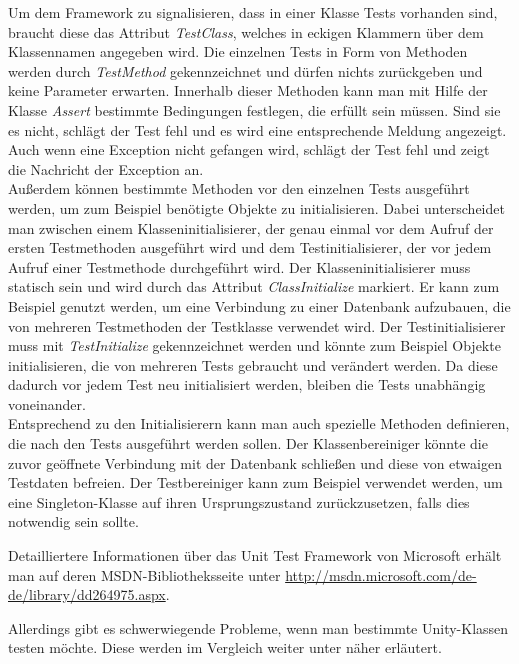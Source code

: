 Um dem Framework zu signalisieren, dass in einer Klasse Tests vorhanden sind, braucht diese das Attribut \textit{TestClass}, welches in eckigen Klammern über dem Klassennamen angegeben wird. Die einzelnen Tests in Form von Methoden werden durch \textit{TestMethod} gekennzeichnet und dürfen nichts zurückgeben und keine Parameter erwarten. Innerhalb dieser Methoden kann man mit Hilfe der Klasse \textit{Assert} bestimmte Bedingungen festlegen, die erfüllt sein müssen. Sind sie es nicht, schlägt der Test fehl und es wird eine entsprechende Meldung angezeigt. Auch wenn eine Exception nicht gefangen wird, schlägt der Test fehl und zeigt die Nachricht der Exception an.\\
Außerdem können bestimmte Methoden vor den einzelnen Tests ausgeführt werden, um zum Beispiel benötigte Objekte zu initialisieren. Dabei unterscheidet man zwischen einem Klasseninitialisierer, der genau einmal vor dem Aufruf der ersten Testmethoden ausgeführt wird und dem Testinitialisierer, der vor jedem Aufruf einer Testmethode durchgeführt wird. Der Klasseninitialisierer muss statisch sein und wird durch das Attribut \textit{ClassInitialize} markiert. Er kann zum Beispiel genutzt werden, um eine Verbindung zu einer Datenbank aufzubauen, die von mehreren Testmethoden der Testklasse verwendet wird. Der Testinitialisierer muss mit \textit{TestInitialize} gekennzeichnet werden und könnte zum Beispiel Objekte initialisieren, die von mehreren Tests gebraucht und verändert werden. Da diese dadurch vor jedem Test neu initialisiert werden, bleiben die Tests unabhängig voneinander.\\
Entsprechend zu den Initialisierern kann man auch spezielle Methoden definieren, die nach den Tests ausgeführt werden sollen. Der Klassenbereiniger könnte die zuvor geöffnete Verbindung mit der Datenbank schließen und diese von etwaigen Testdaten befreien. Der Testbereiniger kann zum Beispiel verwendet werden, um eine Singleton-Klasse auf ihren Ursprungszustand zurückzusetzen, falls dies notwendig sein sollte.

Detailliertere Informationen über das Unit Test Framework von Microsoft erhält man auf deren MSDN-Bibliotheksseite unter \url{http://msdn.microsoft.com/de-de/library/dd264975.aspx}.

Allerdings gibt es schwerwiegende Probleme, wenn man bestimmte Unity-Klassen testen möchte. Diese werden im Vergleich weiter unter näher erläutert. 

